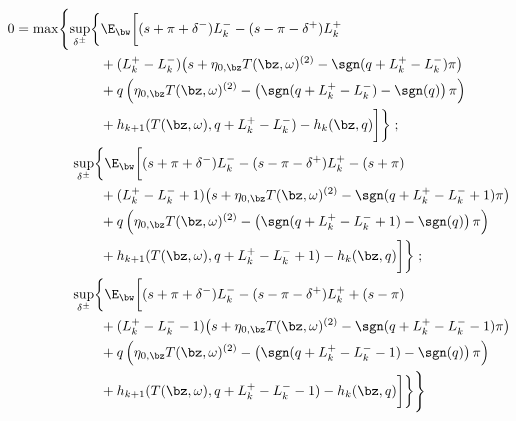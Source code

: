 \documentclass[12pt]{article}
\begin{document}
\begin{align}
\begin{split}
0 & = \max \Biggl\lbrace 
\sup_{\delta^\pm} \biggl\lbrace \E_{\bw} \biggl[
(s + \pi + \delta^-)L_k^- - (s - \pi - \delta^+)L_k^+ \\
& \hphantom{\sup_{\bu} \biggl\lbrace \E_{\bw} \biggl[ {}+{}} + (L_k^+ - L_k^-) \bigl( s + \eta_{0,\bz} T(\bz, \omega)^{(2)}  -\sgn( q + L_k^+ - L_k^-)\pi   \bigr) \\
& \hphantom{\sup_{\bu} \biggl\lbrace \E_{\bw} \biggl[ {}+{}} + q\left( \eta_{0,\bz} T(\bz, \omega)^{(2)}  -\left( \sgn( q + L_k^+ - L_k^-) - \sgn(q) \right) \pi \right) \\
& \hphantom{\sup_{\bu} \biggl\lbrace \E_{\bw} \biggl[ {}+{}} + h_{k+1}(T(\bz,\omega), q + L_k^+ - L_k^- ) -  h_k(\bz,q) \biggr] \biggr\rbrace \; ;\\
& \hphantom{{}={} \max \biggl\lbrace } \sup_{\delta^\pm} \biggl\lbrace \E_{\bw} \biggl[
(s + \pi + \delta^-)L_k^- - (s - \pi - \delta^+)L_k^+ - (s + \pi)\\
& \hphantom{\sup_{\bu} \biggl\lbrace \E_{\bw} \biggl[ {}+{}} + (L_k^+ - L_k^- +1) \bigl( s + \eta_{0,\bz} T(\bz, \omega)^{(2)}  -\sgn( q + L_k^+ - L_k^- +1)\pi   \bigr) \\
& \hphantom{\sup_{\bu} \biggl\lbrace \E_{\bw} \biggl[ {}+{}} + q\left( \eta_{0,\bz} T(\bz, \omega)^{(2)}  -\left( \sgn( q + L_k^+ - L_k^- +1) - \sgn(q) \right) \pi \right) \\
& \hphantom{\sup_{\bu} \biggl\lbrace \E_{\bw} \biggl[ {}+{}} + h_{k+1}(T(\bz,\omega), q + L_k^+ - L_k^- + 1) -  h_k(\bz,q) \biggr] \biggr\rbrace \; ; \\
& \hphantom{{}={} \max \biggl\lbrace } \sup_{\delta^\pm} \biggl\lbrace \E_{\bw} \biggl[
(s + \pi + \delta^-)L_k^- - (s - \pi - \delta^+)L_k^+ + (s - \pi) \\
& \hphantom{\sup_{\bu} \biggl\lbrace \E_{\bw} \biggl[ {}+{}} + (L_k^+ - L_k^- -1) \bigl( s + \eta_{0,\bz} T(\bz, \omega)^{(2)}  -\sgn( q + L_k^+ - L_k^- -1)\pi   \bigr) \\
& \hphantom{\sup_{\bu} \biggl\lbrace \E_{\bw} \biggl[ {}+{}} + q\left( \eta_{0,\bz} T(\bz, \omega)^{(2)}  -\left( \sgn( q + L_k^+ - L_k^- -1) - \sgn(q) \right) \pi \right) \\
& \hphantom{\sup_{\bu} \biggl\lbrace \E_{\bw} \biggl[ {}+{}} + h_{k+1}(T(\bz,\omega), q + L_k^+ - L_k^- -1) -  h_k(\bz,q) \biggr] \biggr\rbrace  \Biggr\rbrace
\end{split}
\end{align}
\end{document}
